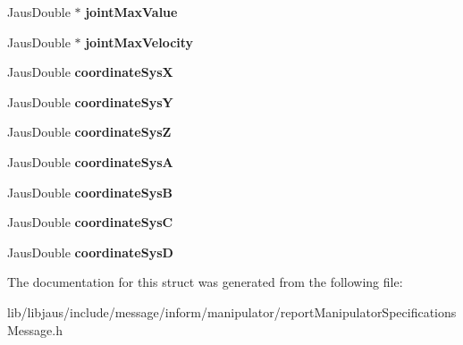 \begin{DoxyCompactItemize}
\item 
\hypertarget{struct_report_manipulator_specifications_message_struct_a7b4618999122c26407c1ef57023f336e}{\-Jaus\-Double $\ast$ {\bfseries joint\-Max\-Value}}\label{struct_report_manipulator_specifications_message_struct_a7b4618999122c26407c1ef57023f336e}

\item 
\hypertarget{struct_report_manipulator_specifications_message_struct_aeade25148c896fda4905f3e7ce5ee3d1}{\-Jaus\-Double $\ast$ {\bfseries joint\-Max\-Velocity}}\label{struct_report_manipulator_specifications_message_struct_aeade25148c896fda4905f3e7ce5ee3d1}

\item 
\hypertarget{struct_report_manipulator_specifications_message_struct_adfe872110dbdf6520fada376414c35e0}{\-Jaus\-Double {\bfseries coordinate\-Sys\-X}}\label{struct_report_manipulator_specifications_message_struct_adfe872110dbdf6520fada376414c35e0}

\item 
\hypertarget{struct_report_manipulator_specifications_message_struct_a9dc14e29e0ab0728c8cd137dead56b49}{\-Jaus\-Double {\bfseries coordinate\-Sys\-Y}}\label{struct_report_manipulator_specifications_message_struct_a9dc14e29e0ab0728c8cd137dead56b49}

\item 
\hypertarget{struct_report_manipulator_specifications_message_struct_abe9c33f6cb253eda7e22bb2c2e19e422}{\-Jaus\-Double {\bfseries coordinate\-Sys\-Z}}\label{struct_report_manipulator_specifications_message_struct_abe9c33f6cb253eda7e22bb2c2e19e422}

\item 
\hypertarget{struct_report_manipulator_specifications_message_struct_ad0f21f9a7a211b557fd4716a4a3b15aa}{\-Jaus\-Double {\bfseries coordinate\-Sys\-A}}\label{struct_report_manipulator_specifications_message_struct_ad0f21f9a7a211b557fd4716a4a3b15aa}

\item 
\hypertarget{struct_report_manipulator_specifications_message_struct_a3d10b411e40daaa0f851a1688b7a0931}{\-Jaus\-Double {\bfseries coordinate\-Sys\-B}}\label{struct_report_manipulator_specifications_message_struct_a3d10b411e40daaa0f851a1688b7a0931}

\item 
\hypertarget{struct_report_manipulator_specifications_message_struct_a3cff59ead3fa9c9d121fc597a73f1f61}{\-Jaus\-Double {\bfseries coordinate\-Sys\-C}}\label{struct_report_manipulator_specifications_message_struct_a3cff59ead3fa9c9d121fc597a73f1f61}

\item 
\hypertarget{struct_report_manipulator_specifications_message_struct_a505a43253c5090a85f20e2cd56b0ea7c}{\-Jaus\-Double {\bfseries coordinate\-Sys\-D}}\label{struct_report_manipulator_specifications_message_struct_a505a43253c5090a85f20e2cd56b0ea7c}

\end{DoxyCompactItemize}


\-The documentation for this struct was generated from the following file\-:\begin{DoxyCompactItemize}
\item 
lib/libjaus/include/message/inform/manipulator/report\-Manipulator\-Specifications\-Message.\-h\end{DoxyCompactItemize}

